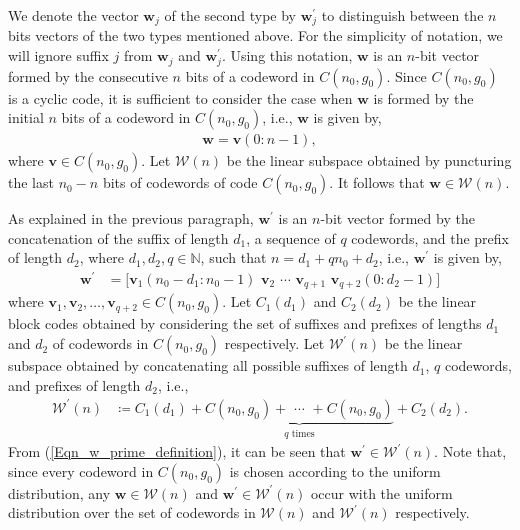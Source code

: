 \documentclass[10pt,journal]{IEEEtran}
\begin{document}
We denote the vector $\mathbf{w}_j$ of the second type by $\mathbf{w}_j^{\prime}$ to distinguish between the $n$ bits vectors
of the two types mentioned above.
For the simplicity of notation, we will ignore suffix $j$ from $\mathbf{w}_j$ and $\mathbf{w}_j^{\prime}$.
Using this notation, $\mathbf{w}$ is an $n$-bit vector formed by the consecutive $n$ bits of a codeword in $C(n_0,g_0)$.
Since $C(n_0,g_0)$ is a cyclic code, it is sufficient to consider the case when $\mathbf{w}$ is formed by 
the initial $n$ bits of a codeword in $C(n_0,g_0)$, i.e., $\mathbf{w}$ is given by,
% 
\begin{align}
%  
\mathbf{w} = \mathbf{v}(0:n-1),
\label{Eqn_w_definition}
% 
\end{align}
% 
where $\mathbf{v} \in C(n_0,g_0)$.
Let $\mathcal{W}(n)$ be the linear subspace obtained by puncturing the last $n_0-n$ bits of codewords of code $C(n_0,g_0)$.
It follows that $\mathbf{w} \in \mathcal{W}(n)$. 

As explained in the previous paragraph, $\mathbf{w}^{\prime}$ is an $n$-bit vector formed by 
the concatenation of the suffix of length $d_1$, a sequence of $q$ codewords, and the prefix of
length $d_2$, where $d_1,d_2, q \in \mathbb{N}$, 
such that $n = d_1+qn_0+d_2$, i.e., $\mathbf{w}^{\prime}$ is given by,
% 
\begin{align}
% 
\mathbf{w}^{\prime} &= \Big[ \mathbf{v}_{1}(n_0-d_1:n_0-1)  \mbox{~} \mathbf{v}_{2} \mbox{~} \cdots \mbox{~} \mathbf{v}_{q+1}  \mbox{~} \mathbf{v}_{q+2}(0:d_2-1) \Big]  
\label{Eqn_w_prime_definition}
% 
\end{align}
%
where $\mathbf{v}_1, \mathbf{v}_2, \ldots, \mathbf{v}_{q+2} \in C(n_0,g_0)$.
Let $C_1(d_1)$ and $C_2(d_2)$ be the linear block codes obtained by 
considering the set of suffixes and prefixes of lengths $d_1$ and $d_2$ of codewords in $C(n_0,g_0)$ respectively.
Let $\mathcal{W}^{\prime}(n)$ be the linear subspace obtained by concatenating 
all possible suffixes of length $d_1$, $q$ codewords, and prefixes of length $d_2$, i.e., 
% 
% 
\begin{align}
%  
\mathcal{W}^{\prime}(n) & \coloneqq  C_1(d_1) + 
\underbrace{ C(n_0,g_0) + \mbox{~} \cdots \mbox{~} + C(n_0,g_0)}_{q \text{ times}} + C_2(d_2).
\label{Eqn_Wn_prime_pre_suff_definition}
% 
\end{align}
% 
% 
From (\ref{Eqn_w_prime_definition}), it can be seen that $\mathbf{w}^{\prime} \in \mathcal{W}^{\prime}(n)$.
Note that, since every codeword in $C(n_0,g_0)$ is chosen according to the uniform
distribution, any $\mathbf{w} \in \mathcal{W}(n)$ and $\mathbf{w}^{\prime} \in \mathcal{W}^{\prime}(n)$ 
occur with the uniform distribution over the set of codewords in $\mathcal{W}(n)$ and $\mathcal{W}^{\prime}(n)$ respectively.
\end{document}

